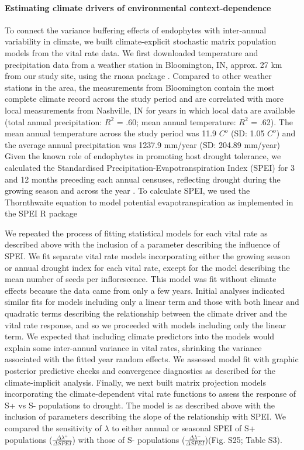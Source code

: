 \documentclass[12pt]{article}
\begin{document}
\paragraph*{Estimating climate drivers of environmental context-dependence}
To connect the variance buffering effects of endophytes with inter-annual variability in climate, we built climate-explicit stochastic matrix population models from the vital rate data.
We first downloaded temperature and precipitation data from a weather station in Bloomington, IN,  approx. 27 km from our study site, using the rnoaa package \cite{chamberlain2022package}. 
Compared to other weather stations in the area, the measurements from Bloomington contain the most complete climate record across the study period and are correlated with more local measurements from Nashville, IN for years in which local data are available (total annual precipitation: $R^2$ = .60; mean annual temperature: $R^2$ = .62).
The mean annual temperature across the study period was 11.9 $C^o $ (SD: 1.05 $C^o $) and the average annual precipitation was 1237.9 mm/year (SD: 204.89 mm/year)
Given the known role of endophytes in promoting host drought tolerance, we calculated the Standardised Precipitation-Evapotranspiration Index (SPEI) for 3 and 12 months preceding each annual censuses, reflecting drought during the growing season and across the year \cite{vicente2010multiscalar}.
To calculate SPEI, we used the Thornthwaite equation to model potential evapotranspiration as implemented in the SPEI R package \cite{begueria2013spei}

We repeated the process of fitting statistical models for each vital rate as described above with the inclusion of a parameter describing the influence of SPEI. 
We fit separate vital rate models incorporating either the growing season or annual drought index for each vital rate, except for the model describing the mean number of seeds per inflorescence. 
This model was fit without climate effects because the data came from only a few years.
Initial analyses indicated similar fits for models including only a linear term and those with both linear and  quadratic terms describing the relationship between the climate driver and the vital rate response, and so we proceeded with models including only the linear term.
We expected that including climate predictors into the models would explain some inter-annual variance in vital rates, shrinking the variance associated with the fitted year random effects.
We assessed model fit with graphic posterior predictive checks and convergence diagnostics as described for the climate-implicit analysis. 
Finally, we next built matrix projection models incorporating the climate-dependent vital rate functions to assess the response of S+ vs S- populations to drought. 
The model is as described above with the inclusion of parameters describing the slope of the relationship with SPEI. 
We compared the sensitivity of $\lambda$ to either annual or seasonal SPEI of S+ populations ($\frac{\Delta\lambda^{+}}{\Delta SPEI}$) with those of S- populations ($\frac{\Delta\lambda^{-}}{\Delta SPEI}$)(Fig. S25; Table S3).
\end{document}
